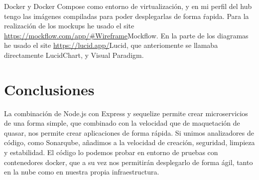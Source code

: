 \documentclass[11pt,spanish,listoffigures,listoftables]{tfgetsinf}
\begin{document}
Docker y Docker Compose como entorno de virtualización, y en mi perfil del hub tengo las imágenes compiladas para poder desplegarlas de forma ŕapida. 
Para la realización de los mockups he usado el site \url{https://mockflow.com/app/#Wireframe}{Mockflow}.
En la parte de los diagramas he usado el site \url{https://lucid.app/}{Lucid}, que anteriomente se llamaba directamente LucidChart, y Visual Paradigm.


\chapter{Conclusiones}

La combinación de Node.js con Express y sequelize permite crear microservicios de una forma simple, que combinado con la velocidad que de maquetación de quasar, nos permite crear aplicaciones de forma rápida.
Si unimos analizadores de código, como Sonarqube, añadimos a la velocidad de creación, seguridad, limpieza y estabilidad. 
El código lo podemos probar en entorno de pruebas con contenedores docker, que a su vez nos permitirán desplegarlo de forma ágil, tanto en la nube como en nuestra propia infraestructura.

\end{document}
